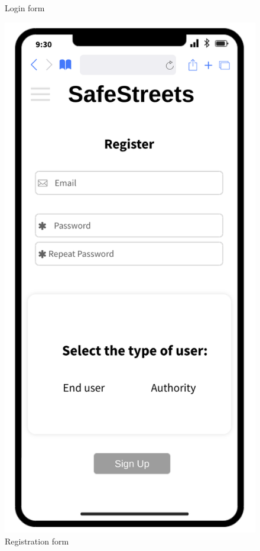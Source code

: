 \begin{figure}[H]
\begin{minipage}[b]{0.40\textwidth}
			\caption{Login form}
		\end{minipage}
		\hfill
		\begin{minipage}[b]{0.40\textwidth}
			\includegraphics[width=\textwidth]{Images/rasd-mocks/registration.png}
			\caption{Registration form}
		\end{minipage}
	\end{figure}

